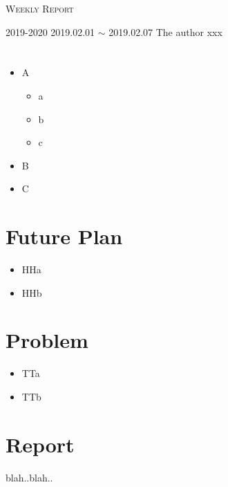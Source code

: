 \documentclass{scrartcl}
\begin{document}
\title{}
\date{}
\maketitle
\vspace{-15ex}

\begin{flushleft}
{\LARGE \textsc{Weekly Report}}
\vspace{3ex}

2019-2020  \hspace{1.5cm} 2019.02.01 $\sim$ 2019.02.07 \hfill The author xxx
\vspace{-3ex}
\end{flushleft}
\vspace{-4ex}

\section{}
\begin{itemize}
\item A
  \begin{itemize}
  \item a
  \item b
  \item c
  \end{itemize}
\item B
\item C
\end{itemize}
  
\section{\geo Future Plan}
\begin{itemize}
\item HHa
\item HHb
\end{itemize}
  
\section{\geo Problem}
\begin{itemize}
\item TTa
\item TTb
\end{itemize}
\section{\geo Report}
blah..blah..
\end{document}
